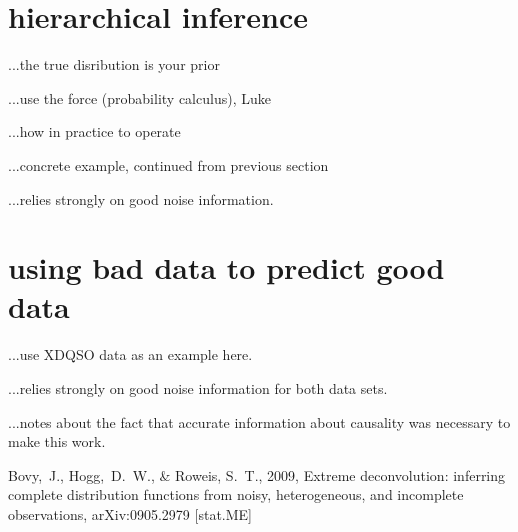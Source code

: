 \documentclass[12pt,twoside]{article}
\begin{document}
\section{hierarchical inference}

...the true disribution is your prior

...use the force (probability calculus), Luke

...how in practice to operate

...concrete example, continued from previous section

...relies strongly on good noise information.

\section{using bad data to predict good data}

...use XDQSO data as an example here.

...relies strongly on good noise information for both data sets.

...notes about the fact that accurate information about causality was
necessary to make this work.

\clearpage
{}\theendnotes

\clearpage
\begin{thebibliography}{}
  Bovy,~J., Hogg,~D.~W., \& Roweis, S.~T., 2009,
  Extreme deconvolution: inferring complete distribution functions from noisy, heterogeneous, and incomplete observations, 
  arXiv:0905.2979 [stat.ME]
\end{thebibliography}
\end{document}
